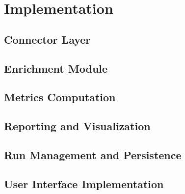 \chapter{Implementation}
\label{cha:implementation}

\section{Connector Layer}

\section{Enrichment Module}

\section{Metrics Computation}

\section{Reporting and Visualization}

\section{Run Management and Persistence}

\section{User Interface Implementation}
